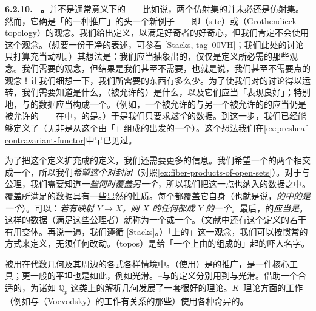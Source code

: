 \textbf{6.2.10. \extrahard\ \trGrothendieck\trTopology。}\quad \trDistinguishedAffineBase{}并不是通常意义下的\trTopology{}——比如说，两个仿射集的并未必还是仿射集。然而，它确是「\trTopology{}的一种推广」的头一个新例子——即\textbf{\trSite}（site）或\textbf{\trGrothendieck\trTopology}（Grothendieck topology）的观念。我们给出定义，以满足好奇者的好奇心，但我们肯定不会使用这个观念。（想要一份干净的表述，可参看 [Stacks, tag~00VH]；我们此处的讨论只打算充当动机。）其想法是：我们应当抽象出的，仅仅是定义\trSheaf{}所必需的那些观念。我们需要\trOpenSet{}的观念，但结果是我们甚至不需要\trUnderlyingSet，也就是说，我们甚至不需要点的观念！让我们细想一下，我们所需要的东西有多么少。为了使我们对\trSheaf{}的讨论得以运转，我们需要知道\trOpenSet{}是什么，（被允许的）\trInclusionMap{}是什么，以及它们应当「表现良好」；特别地，\trOpenSet{}与\trInclusionMap{}的数据应当构成一个\trCategory{}。（例如，一个被允许的\trInclusionMap{}与另一个被允许的\trInclusionMap{}的\trComposition{}应当仍是被允许的\trInclusionMap——在\trDistinguishedAffineBase{}中，\trDistinguishedOpen{}的\trDistinguishedOpen{}是\trDistinguishedOpen。）于是我们只要求\emph{这个\trCategory}的数据。到这一步，我们已经能够定义\trPresheaf{}了（无非是从这个由「\trOpenSet」组成的\trCategory{}出发的一个\trContravariantFunctor{}）。这个想法我们在\cref{ex:presheaf-contravariant-functor}中早已见过。

为了把这个定义扩充成\trSheaf{}的定义，我们还需要更多的信息。我们希望一个\trOpenSet{}的两个\trOpenSubset{}相交成一个\trOpenSet，所以我们\emph{希望这个\trCategory{}对\trFiberProduct{}封闭}（对照\cref{ex:fiber-products-of-open-sets}）。对于\trIdentityAxiom{}与\trGluability{}公理，我们需要知道\emph{一些\trOpenSet{}何时覆盖另一个\trOpenSet}，所以我们把这一点也纳入\trGrothendieck\trTopology{}的数据之中。覆盖所满足的数据具有一些显然的性质。每个\trOpenSet{}都覆盖它自身（也就是说，\emph{\trOpenSet{}的\trCategory{}中的\trIdMorphism{}是一个\trCover}）。\trCover{}可以\trPullback：\emph{若有映射 $Y\to X$，则 $X$ 的任何\trCover{}都\trPullback{}成 $Y$ 的一个\trCover}。最后，\trCover{}的\trCover{}\emph{应当是\trCover}。这样的数据（满足这些公理者）就称为一个\trGrothendieck\trTopology{}或一个\textbf{\trSite}。（文献中还有这个定义的若干有用变体。再说一遍，我们遵循 [Stacks]。）「\trGrothendieck\trTopology{}上的\trSheaf」这一观念，我们可以按惯常的方式来定义，无须任何改动。\textbf{\trTopos}（topos）是给「一个\trGrothendieck\trTopology{}上由\trSet{}的\trSheaf{}组成的\trCategory{}」起的吓人名字。

\trGrothendieck\trTopology{}被用在代数几何及其周边的各式各样情境中。\trEtale{}\trCohomology{}（使用\trEtale{}\trTopology）是\trGalois\trCohomology{}的推广，是一件核心工具；更一般的平坦\trTopology{}也是如此，例如光滑\trTopology。\trDeligne--\trMumford\trStack{}与\trArtin\trStack{}的定义分别用到\trEtale{}\trTopology{}与光滑\trTopology。\trTate{}借助一个合适的\trGrothendieck\trTopology，为诸如 $\mathbb{Q}_p$ 这类\trTotallyDisconnected{}\trBaseField{}上的\trNonArchimedean{}解析几何发展了一套很好的理论。$K$~理论方面的工作（例如与\trVoevodsky{}（Voevodsky）的工作有关系的那些）使用各种奇异的\trTopology。
